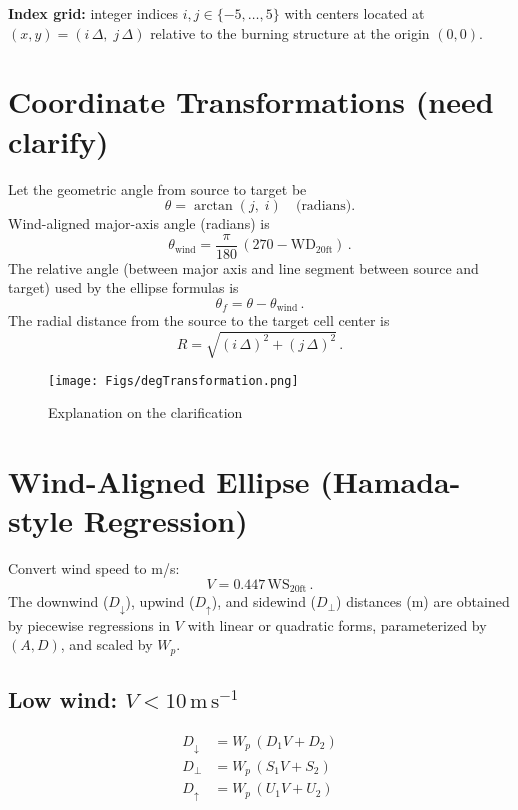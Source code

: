 \documentclass[a4paper,12pt]{article}
\begin{document}
\noindent\textbf{Index grid:} integer indices $i,j\in\{-5,\ldots,5\}$ with centers located at $(x,y)=(i\,\Delta,\; j\,\Delta)$ relative to the burning structure at the origin $(0,0)$.

\section{Coordinate Transformations (need clarify)}

Let the geometric angle from source to target be
\begin{equation}
  \theta=\arctan(j,\; i)\quad \text{(radians)}.
\end{equation}
Wind-aligned major-axis angle (radians) is
\begin{equation}
  \theta_{\mathrm{wind}}=\frac{\pi}{180}\,(270-\mathrm{WD_{20ft}})\, .
\end{equation}
The relative angle (between major axis and line segment between source and target) used by the ellipse formulas is
\begin{equation}
  \theta_f=\theta-\theta_{\mathrm{wind}}\, .
\end{equation}
The radial distance from the source to the target cell center is
\begin{equation}
  R=\sqrt{(i\,\Delta)^2+(j\,\Delta)^2}\, .
\end{equation}

\begin{figure}[h!]
	\centering
	\texttt{[image: Figs/degTransformation.png]}
	\caption{Explanation on the clarification}
	\label{fig:models_and_rules}
\end{figure}

\section{Wind-Aligned Ellipse (Hamada-style Regression)}\label{ellipse}

Convert wind speed to m/s:
\begin{equation}
  V=0.447\,\mathrm{WS_{20ft}}\, .
\end{equation}
The downwind ($D_\downarrow$), upwind ($D_\uparrow$), and sidewind ($D_\perp$) distances (m) are obtained by piecewise regressions in $V$ with linear or quadratic forms, parameterized by $(A,D)$, and scaled by $W_p$.

\subsection*{Low wind: $V<10\,\mathrm{m\,s^{-1}}$}
\begin{align}
D_\downarrow &= W_p\,(D_1 V + D_2)\\
D_\perp &= W_p\,(S_1 V + S_2)\\
D_\uparrow &= W_p\,(U_1 V + U_2)
\end{align}
\end{document}
